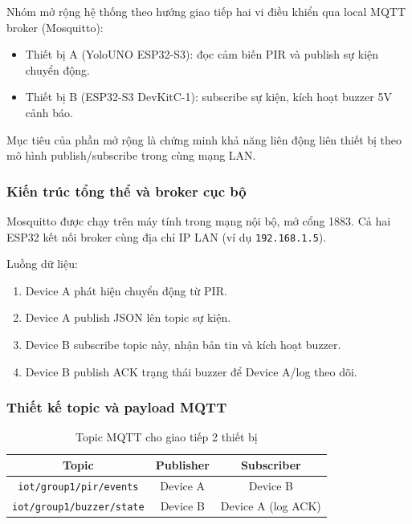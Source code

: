 Nhóm mở rộng hệ thống theo hướng giao tiếp hai vi điều khiển qua local MQTT broker (Mosquitto):
\begin{itemize}
    \item Thiết bị A (YoloUNO ESP32-S3): đọc cảm biến PIR và publish sự kiện chuyển động.
    \item Thiết bị B (ESP32-S3 DevKitC-1): subscribe sự kiện, kích hoạt buzzer 5V cảnh báo.
\end{itemize}

Mục tiêu của phần mở rộng là chứng minh khả năng liên động liên thiết bị theo mô hình publish/subscribe trong cùng mạng LAN.

\subsubsection*{Kiến trúc tổng thể và broker cục bộ}

Mosquitto được chạy trên máy tính trong mạng nội bộ, mở cổng 1883. Cả hai ESP32 kết nối broker cùng địa chỉ IP LAN (ví dụ \texttt{192.168.1.5}).

Luồng dữ liệu:
\begin{enumerate}
    \item Device A phát hiện chuyển động từ PIR.
    \item Device A publish JSON lên topic sự kiện.
    \item Device B subscribe topic này, nhận bản tin và kích hoạt buzzer.
    \item Device B publish ACK trạng thái buzzer để Device A/log theo dõi.
\end{enumerate}

\subsubsection*{Thiết kế topic và payload MQTT}

\begin{table}[h!]
\centering
\caption{Topic MQTT cho giao tiếp 2 thiết bị}
\label{tab:mqtt-topics}
\begin{tabular}{|c|c|c|}
\hline
\textbf{Topic} & \textbf{Publisher} & \textbf{Subscriber} \\
\hline
\texttt{iot/group1/pir/events} & Device A & Device B \\
\hline
\texttt{iot/group1/buzzer/state} & Device B & Device A (log ACK) \\
\hline
\end{tabular}
\end{table}

